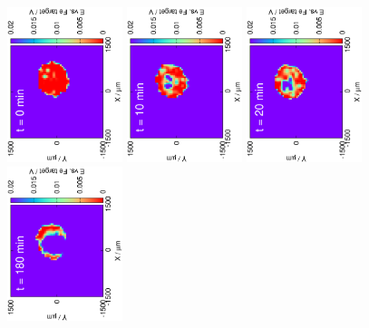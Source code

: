 \documentclass[3p]{elsarticle}
\begin{document}
\begin{figure}[H]
\centering
\includegraphics[trim = 20mm 30mm 0mm 20mm, clip, width=0.3\textwidth, angle=-90]{17052401.eps} 
\includegraphics[trim = 20mm 30mm 0mm 20mm, clip, width=0.3\textwidth, angle=-90]{17052402.eps}
\includegraphics[trim = 20mm 30mm 0mm 20mm, clip, width=0.3\textwidth, angle=-90]{17052403.eps} 
\includegraphics[trim = 20mm 30mm 0mm 20mm, clip, width=0.3\textwidth, angle=-90]{17052405.eps} 

\end{figure}
\end{document}
